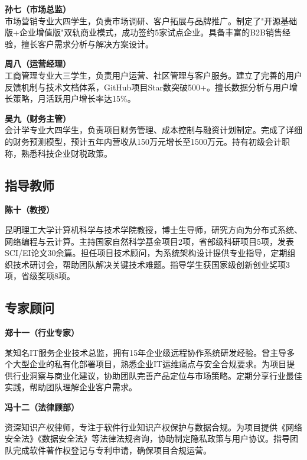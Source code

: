 \documentclass[12pt,a4paper]{article}
\begin{document}
\textbf{孙七（市场总监）}\\
市场营销专业大四学生，负责市场调研、客户拓展与品牌推广。制定了"开源基础版+企业增值版"双轨商业模式，成功签约5家试点企业。具备丰富的B2B销售经验，擅长客户需求分析与解决方案设计。

\textbf{周八（运营经理）}\\
工商管理专业大三学生，负责用户运营、社区管理与客户服务。建立了完善的用户反馈机制与技术文档体系，GitHub项目Star数突破500+。擅长数据分析与用户增长策略，月活跃用户增长率达15\%。

\textbf{吴九（财务主管）}\\
会计学专业大四学生，负责项目财务管理、成本控制与融资计划制定。完成了详细的财务预测模型，预计五年内营收从150万元增长至1500万元。持有初级会计职称，熟悉科技企业财税政策。

\subsection{指导教师}

\textbf{陈十（教授）}

昆明理工大学计算机科学与技术学院教授，博士生导师，研究方向为分布式系统、网络编程与云计算。主持国家自然科学基金项目2项，省部级科研项目5项，发表SCI/EI论文30余篇。担任项目技术顾问，为系统架构设计提供专业指导，定期组织技术研讨会，帮助团队解决关键技术难题。指导学生获国家级创新创业奖项3项，省级奖项8项。

\subsection{专家顾问}

\textbf{郑十一（行业专家）}

某知名IT服务企业技术总监，拥有15年企业级远程协作系统研发经验。曾主导多个大型企业的私有化部署项目，熟悉企业IT运维痛点与安全合规要求。为项目提供行业洞察与商业化建议，协助团队完善产品定位与市场策略。定期分享行业最佳实践，帮助团队理解企业客户需求。

\textbf{冯十二（法律顾部）}

资深知识产权律师，专注于软件行业知识产权保护与数据合规。为项目提供《网络安全法》《数据安全法》等法律法规咨询，协助制定隐私政策与用户协议。指导团队完成软件著作权登记与专利申请，确保项目合规运营。
\end{document}
